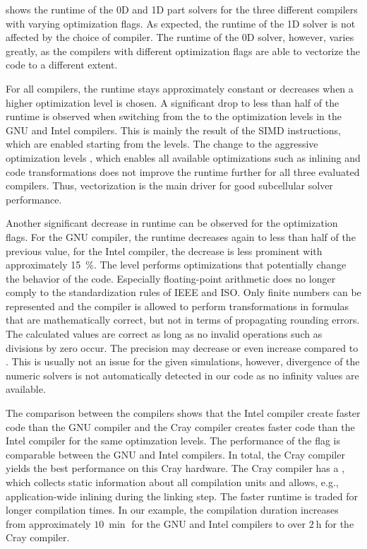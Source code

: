  shows the runtime of the 0D and 1D part solvers for the three different compilers with varying optimization flags.
As expected, the runtime of the 1D solver is not affected by the choice of compiler. The runtime of the 0D solver, however, varies greatly, as the compilers with different optimization flags are able to vectorize the code to a different extent.

For all compilers, the runtime stays approximately constant or decreases when a higher optimization level is chosen. A significant drop to less than half of the runtime is observed when switching from the  to the  optimization levels in the GNU and Intel compilers. This is mainly the result of the SIMD instructions, which are enabled starting from the  levels.
The change to the aggressive optimization levels , which enables all available optimizations such as inlining and code transformations does not improve the runtime further for all three evaluated compilers. Thus, vectorization is the main driver for good subcellular solver performance.

Another significant decrease in runtime can be observed for the  optimization flags. For the GNU compiler, the runtime decreases again to less than half of the previous value, for the Intel compiler, the decrease is less prominent with approximately \SI{15}{\percent}. The  level performs optimizations that potentially change the behavior of the code. 
Especially floating-point arithmetic does no longer comply to the standardization rules of IEEE and ISO. Only finite numbers can be represented and the compiler is allowed to perform transformations in formulas that are mathematically correct, but not in terms of propagating rounding errors. The calculated values are correct as long as no invalid operations such as divisions by zero occur. The precision may decrease or even increase compared to . This is usually not an issue for the given simulations, however, divergence of the numeric solvers is not automatically detected in our code as no infinity values are available.

The comparison between the compilers shows that the Intel compiler create faster code than the GNU compiler and the Cray compiler creates faster code than the Intel compiler for the same optimzation levels. The performance of the  flag is comparable between the GNU and Intel compilers. In total, the Cray compiler yields the best performance on this Cray hardware. The Cray compiler has a , which collects static information about all compilation units and allows, e.g., application-wide inlining during the linking step. The faster runtime is traded for longer compilation times. In our example, the compilation duration increases from approximately $\SI{10}{\min}$ for the GNU and Intel compilers to over $\SI{2}{\hour}$ for the Cray compiler.

